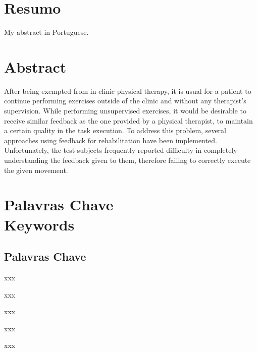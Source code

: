 \cleardoublepage


\chapter*{Resumo}
\thispagestyle{empty}
 
My abstract in Portuguese.

\newpage


\chapter*{Abstract}
\thispagestyle{empty}

After being exempted from in-clinic physical therapy, 
	it is usual for a patient to continue performing exercises 
	outside of the clinic and without any therapist's supervision.
	While performing unsupervised exercises, it would be desirable 
	to receive similar feedback as the one provided by a physical therapist, to maintain 
	a certain quality in the task execution.
	To address this problem, several approaches using feedback for rehabilitation have been implemented. Unfortunately, the test subjects frequently reported difficulty in completely understanding the feedback given to them, therefore failing to correctly execute the given movement.

\newpage


\chapter*{Palavras Chave \\ Keywords}
\thispagestyle{empty}

\section*{Palavras Chave}
{\large %

\noindent xxx

\noindent xxx

\noindent xxx

\noindent xxx

\noindent xxx

}

